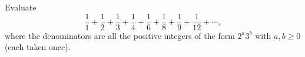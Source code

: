 Evaluate
\[
\dfrac{1}{1}+\dfrac{1}{2}+\dfrac{1}{3}+\dfrac{1}{4}+\dfrac{1}{6}+\dfrac{1}{8}+\dfrac{1}{9}+\dfrac{1}{12}+\cdots,
\]
where the denominators are all the positive integers of the form $2^a3^b$ with $a,b\ge0$ (each taken once).
